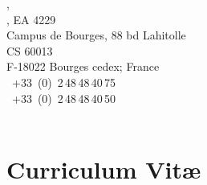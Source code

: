 \begin{minipage}{.34\linewidth}\draftHrule
  \small\sffamily\mdseries\upshape
    {\normalsize\INSA \CVL,} \\
    {, \PRISMEshort EA 4229} \\
    {Campus de Bourges,  88 bd Lahitolle}\\
    {CS 60013}\\
    {F-18022 Bourges cedex; France} \\
    ~{+33~(0)~2\,48\,48\,40\,75}\\
    ~{+33~(0)~2\,48\,48\,40\,50}  \\
    ~ 
\end{minipage}

\HDRskip

\section{Curriculum Vitæ}


